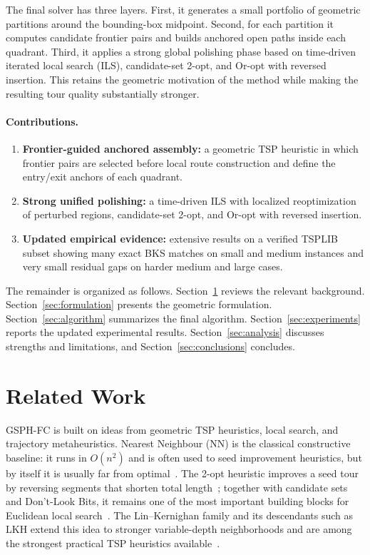 \documentclass[runningheads]{llncs}
\begin{document}
The final solver has three layers. First, it generates a small portfolio
of geometric partitions around the bounding-box midpoint. Second, for
each partition it computes candidate frontier pairs and builds anchored
open paths inside each quadrant. Third, it applies a strong global
polishing phase based on time-driven iterated local search (ILS),
candidate-set 2-opt, and Or-opt with reversed insertion. This retains
the geometric motivation of the method while making the resulting tour
quality substantially stronger.

\paragraph{Contributions.}
\begin{enumerate}
  \item \textbf{Frontier-guided anchored assembly:} a geometric TSP
    heuristic in which frontier pairs are selected before local route
    construction and define the entry/exit anchors of each quadrant.
  \item \textbf{Strong unified polishing:} a time-driven ILS with
    localized reoptimization of perturbed regions, candidate-set 2-opt,
    and Or-opt with reversed insertion.
  \item \textbf{Updated empirical evidence:} extensive results on a
    verified TSPLIB subset showing many exact BKS matches on small and
    medium instances and very small residual gaps on harder medium and
    large cases.
\end{enumerate}

The remainder is organized as follows. Section~\ref{sec:related}
reviews the relevant background. Section~\ref{sec:formulation}
presents the geometric formulation. Section~\ref{sec:algorithm}
summarizes the final algorithm. Section~\ref{sec:experiments} reports
the updated experimental results. Section~\ref{sec:analysis} discusses
strengths and limitations, and Section~\ref{sec:conclusions}
concludes.

\section{Related Work}
\label{sec:related}

GSPH-FC is built on ideas from geometric TSP heuristics, local search,
and trajectory metaheuristics. Nearest Neighbour (NN) is the classical
constructive baseline: it runs in $O(n^2)$ and is often used to seed
improvement heuristics, but by itself it is usually far from
optimal~\cite{kizilatecs2013nearest}. The 2-opt heuristic improves a
seed tour by reversing segments that shorten total
length~\cite{croes1958method}; together with candidate sets and
Don't-Look Bits, it remains one of the most important building blocks
for Euclidean local search~\cite{johnson1997tsp,bentley1992fast}. The
Lin--Kernighan family and its descendants such as LKH extend this idea
to stronger variable-depth neighborhoods and are among the strongest
practical TSP heuristics available~\cite{lin1973effective,helsgaun2000effective,helsgaun2017extension}.
\end{document}
